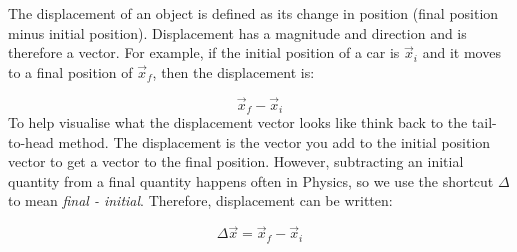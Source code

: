       \label{m38788*id63003}The displacement of an object is defined as its change in position (final position minus initial position). Displacement has a magnitude and direction and is therefore a vector. For example, if the initial position of a car is $\vec{x}_{i}$ and it moves to a final position of $\vec{x}_{f}$, then the displacement is:\par 
      \label{m38788*id63035}\nopagebreak\noindent{}
        
    \begin{equation*}
    \vec{x}_{f}-\vec{x}_{i}
      \end{equation*}
To help visualise what the displacement vector looks like think back to the tail-to-head method. The displacement is the vector you add to the initial position vector to get a vector to the final position.
\label{m38788*notfhsst!!!underscore!!!id194}
      \label{m38788*id63061}However, subtracting an initial quantity from a final quantity happens often in Physics, so we use the shortcut $\Delta $ to mean \textsl{final - initial}. Therefore, displacement can be written:\par 
      \label{m38788*id63080}\nopagebreak\noindent{}
        
    \begin{equation*}
    \Delta \vec{x}=\vec{x}_{f}-\vec{x}_{i}
      \end{equation*}

